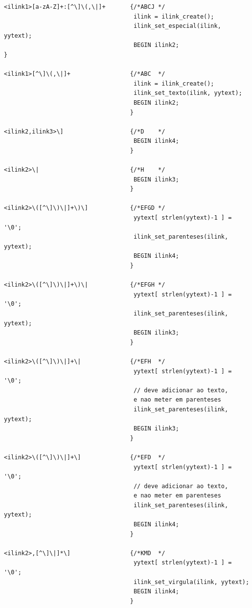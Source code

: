 \documentclass[11pt, a4paper, oneside]{article}
\begin{document}
\begin{verbatim}
<ilink1>[a-zA-Z]+:[^\]\(,\|]+       {/*ABCJ */
                                     ilink = ilink_create();
                                     ilink_set_especial(ilink, yytext);
                                     BEGIN ilink2;                                    }

<ilink1>[^\]\(,\|]+                 {/*ABC  */
                                     ilink = ilink_create();
                                     ilink_set_texto(ilink, yytext);
                                     BEGIN ilink2;
                                    }

<ilink2,ilink3>\]                   {/*D    */
                                     BEGIN ilink4;
                                    }

<ilink2>\|                          {/*H    */
                                     BEGIN ilink3;
                                    }

<ilink2>\([^\]\)\|]+\)\]            {/*EFGD */
                                     yytext[ strlen(yytext)-1 ] = '\0';
                                     ilink_set_parenteses(ilink, yytext);
                                     BEGIN ilink4;
                                    }

<ilink2>\([^\]\)\|]+\)\|            {/*EFGH */
                                     yytext[ strlen(yytext)-1 ] = '\0';
                                     ilink_set_parenteses(ilink, yytext);
                                     BEGIN ilink3;
                                    }

<ilink2>\([^\]\)\|]+\|              {/*EFH  */
                                     yytext[ strlen(yytext)-1 ] = '\0';
                                     // deve adicionar ao texto, 
                                     e nao meter em parenteses
                                     ilink_set_parenteses(ilink, yytext);
                                     BEGIN ilink3;
                                    }

<ilink2>\([^\]\)\|]+\]              {/*EFD  */
                                     yytext[ strlen(yytext)-1 ] = '\0';
                                     // deve adicionar ao texto, 
                                     e nao meter em parenteses
                                     ilink_set_parenteses(ilink, yytext);
                                     BEGIN ilink4;
                                    }

<ilink2>,[^\]\|]*\]                 {/*KMD  */
                                     yytext[ strlen(yytext)-1 ] = '\0';
                                     ilink_set_virgula(ilink, yytext);
                                     BEGIN ilink4;
                                    }


\end{verbatim}
\end{document}
